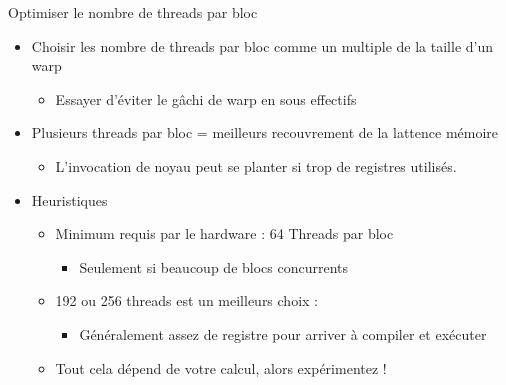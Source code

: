 \documentclass{beamer}
\begin{document}
\begin{frame}{Optimiser le nombre de threads par bloc}

  \begin{itemize}
  \item Choisir les nombre de threads par bloc comme un multiple de la taille d'un warp
    \begin{itemize}
    \item Essayer d'éviter le gâchi de warp en sous effectifs
    \end{itemize}
  \item Plusieurs threads par bloc = meilleurs recouvrement de la lattence mémoire
    \begin{itemize}
    \item L'invocation de noyau peut se planter si trop de registres utilisés.
    \end{itemize}
  \item Heuristiques
    \begin{itemize}
    \item Minimum requis par le hardware : 64 Threads par bloc
      \begin{itemize}
      \item Seulement si beaucoup de blocs concurrents
      \end{itemize}
    \item 192 ou 256 threads est un meilleurs choix  : 
      \begin{itemize}
      \item Généralement assez de registre pour arriver à compiler et exécuter
      \end{itemize}
    \item Tout cela dépend de votre calcul, alors expérimentez !
    \end{itemize}
  \end{itemize}
\end{frame}
\end{document}
